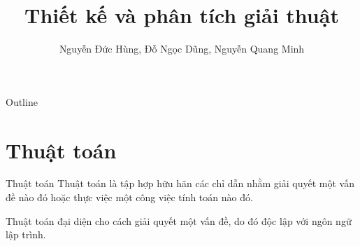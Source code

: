 \documentclass[]{beamer}
\title{Thiết kế và phân tích giải thuật}
\author{Nguyễn Đức Hùng, Đỗ Ngọc Dũng, Nguyễn Quang Minh}
\newenvironment{fr}
               {\begin{frame}{\secname}}
               {\end{frame}}
\begin{document}
\begin{frame}
\maketitle
\end{frame}
\begin{frame}{Outline}
\tableofcontents
\end{frame}

\section{Thuật toán}
\begin{fr}
  \begin{block}{Thuật toán}
    Thuật toán là tập hợp hữu hãn các chỉ dẫn nhằm giải quyết một vấn đề nào đó hoặc thực việc một công việc tính toán nào đó.
  \end{block}
  Thuật toán đại diện cho cách giải quyết một vấn đề, do đó độc lập với ngôn ngữ lập trình.
\end{fr}
\end{document}
